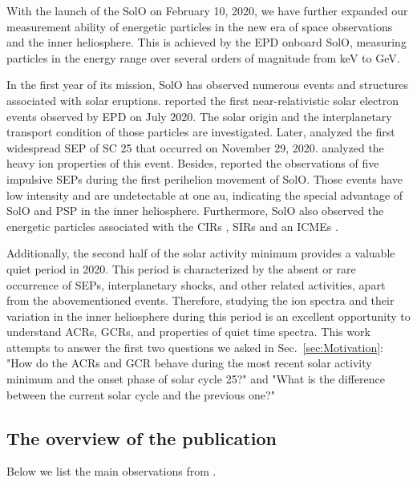 With the launch of the \ac{SolO} on February 10, 2020, we have further expanded our measurement ability of energetic particles in the new era of space observations and the inner heliosphere. This is achieved by the \ac{EPD} onboard \ac{SolO}, measuring particles in the energy range over several orders of magnitude from keV to GeV.

In the first year of its mission, \ac{SolO} has observed numerous events and structures associated with solar eruptions. \citet{GomezHerrero-2021-SolO} reported the first near-relativistic solar electron events observed by \ac{EPD} on July 2020. The solar origin and the interplanetary transport condition of those particles are investigated. Later, \citet{Kolhoff2021AA} analyzed the first widespread \ac{SEP} of \ac{SC} 25 that occurred on November 29, 2020. \citet{Mason2021AA} analyzed the heavy ion properties of this event. Besides, \citet{Mason2021AA_he3rich} reported the observations of five impulsive \acp{SEP} during the first perihelion movement of \ac{SolO}. Those events have low intensity and are undetectable at one au, indicating the special advantage of \ac{SolO} and \acs{PSP} in the inner heliosphere. Furthermore, \ac{SolO} also observed the energetic particles associated with the \acp{CIR} \citep{Allen2021AA_suprathermal}, \acp{SIR} \citep{Aran2021AA} and an \acp{ICME} \citep{Kilpua2021AA}.


Additionally, the second half of the solar activity minimum provides a valuable quiet period in 2020. This period is characterized by the absent or rare occurrence of \acp{SEP}, interplanetary shocks, and other related activities, apart from the abovementioned events. Therefore, studying the ion spectra and their variation in the inner heliosphere during this period is an excellent opportunity to understand \acp{ACR}, \acp{GCR}, and properties of quiet time spectra. 
This work attempts to answer the first two questions we asked in Sec.~\ref{sec:Motivation}: "How do the \acp{ACR} and \ac{GCR} behave during the most recent solar activity minimum and the onset phase of solar cycle 25?" and "What is the difference between the current solar cycle and the previous one?"

\subsection*{The overview of the publication}

Below we list the main observations from \citet{Mason-2021-SolOQuietTime}.

